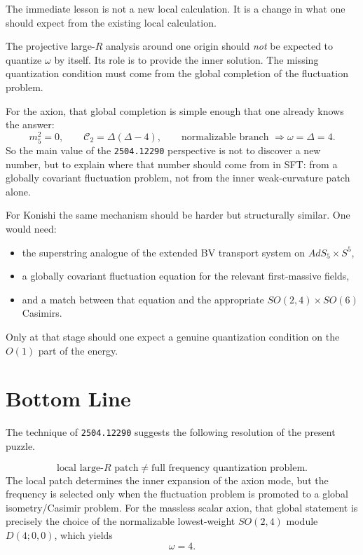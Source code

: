 \documentclass[12pt]{article}
\newcommand{\D}{\Delta}
\newcommand{\cC}{\mathcal{C}}
\begin{document}
The immediate lesson is not a new local calculation.  It is a change in what one should expect from the
existing local calculation.

The projective large-$R$ analysis around one origin should \emph{not} be expected to quantize $\omega$ by
itself.  Its role is to provide the inner solution.  The missing quantization condition must come from the
global completion of the fluctuation problem.

For the axion, that global completion is simple enough that one already knows the answer:
\begin{equation}
m_5^2=0,\qquad \cC_2=\D(\D-4),\qquad \text{normalizable branch } \Rightarrow \omega=\D=4.
\end{equation}
So the main value of the \texttt{2504.12290} perspective is not to discover a new number, but to explain
where that number should come from in SFT: from a globally covariant fluctuation problem, not from the
inner weak-curvature patch alone.

For Konishi the same mechanism should be harder but structurally similar.  One would need:
\begin{itemize}
\item the superstring analogue of the extended BV transport system on $AdS_5\times S^5$,
\item a globally covariant fluctuation equation for the relevant first-massive fields,
\item and a match between that equation and the appropriate $SO(2,4)\times SO(6)$ Casimirs.
\end{itemize}
Only at that stage should one expect a genuine quantization condition on the $O(1)$ part of the energy.

\section{Bottom Line}

The technique of \texttt{2504.12290} suggests the following resolution of the present puzzle.

\begin{equation}
\text{local large-}R\text{ patch} \neq \text{full frequency quantization problem}.
\end{equation}
The local patch determines the inner expansion of the axion mode, but the frequency is selected only when
the fluctuation problem is promoted to a global isometry/Casimir problem.  For the massless scalar axion,
that global statement is precisely the choice of the normalizable lowest-weight $SO(2,4)$ module
$D(4;0,0)$, which yields
\begin{equation}
\omega=4.
\end{equation}
\end{document}
